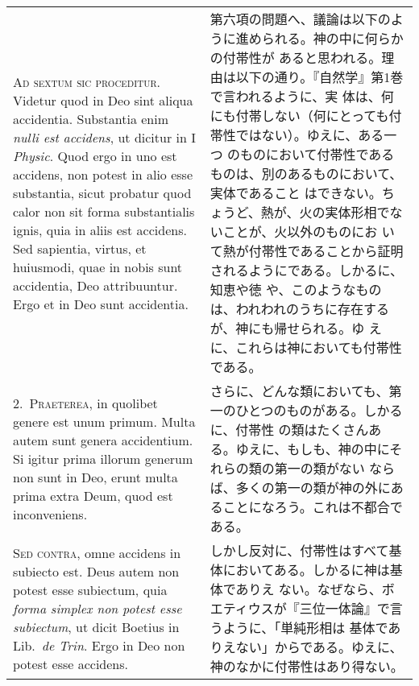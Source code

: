 \documentclass[10pt]{jsarticle}
\begin{document}
\begin{longtable}{p{21em}p{21em}}

{\huge A}{\scshape d sextum sic proceditur}. Videtur quod in Deo sint
 aliqua accidentia. Substantia enim {\itshape nulli est accidens}, ut
 dicitur in I {\itshape Physic}. Quod ergo in uno est accidens, non
 potest in alio esse substantia, sicut probatur quod calor non sit
 forma substantialis ignis, quia in aliis est accidens. Sed sapientia,
 virtus, et huiusmodi, quae in nobis sunt accidentia, Deo
 attribuuntur. Ergo et in Deo sunt accidentia.

&

第六項の問題へ、議論は以下のように進められる。神の中に何らかの付帯性が
あると思われる。理由は以下の通り。『自然学』第1巻で言われるように、実
体は、何にも付帯しない（何にとっても付帯性ではない）。ゆえに、ある一つ
のものにおいて付帯性であるものは、別のあるものにおいて、実体であること
はできない。ちょうど、熱が、火の実体形相でないことが、火以外のものにお
いて熱が付帯性であることから証明されるようにである。しかるに、知恵や徳
や、このようなものは、われわれのうちに存在するが、神にも帰せられる。ゆ
えに、これらは神においても付帯性である。


\\



2.~{\scshape Praeterea}, in quolibet genere est unum primum. Multa autem sunt
 genera accidentium. Si igitur prima illorum generum non sunt in Deo,
 erunt multa prima extra Deum, quod est inconveniens.

&

さらに、どんな類においても、第一のひとつのものがある。しかるに、付帯性
の類はたくさんある。ゆえに、もしも、神の中にそれらの類の第一の類がない
ならば、多くの第一の類が神の外にあることになろう。これは不都合である。

\\


{\scshape Sed contra}, omne accidens in subiecto est. Deus autem non
 potest esse subiectum, quia {\itshape forma simplex non potest esse
 subiectum}, ut dicit Boetius in Lib.~{\itshape de Trin}. Ergo in Deo
 non potest esse accidens.

&

しかし反対に、付帯性はすべて基体においてある。しかるに神は基体でありえ
ない。なぜなら、ボエティウスが『三位一体論』で言うように、「単純形相は
基体でありえない」からである。ゆえに、神のなかに付帯性はあり得ない。

\\


\end{longtable}
\end{document}
